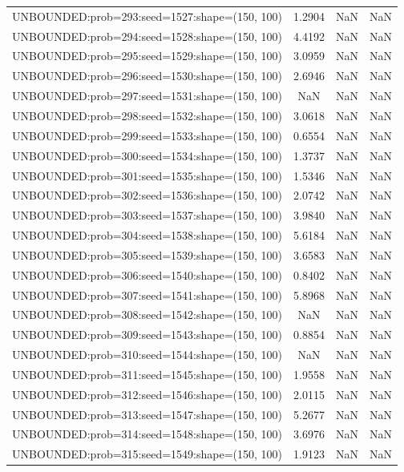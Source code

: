 \begin{longtable}{lccc}
UNBOUNDED:prob=293:seed=1527:shape=(150, 100) &  1.2904 &   NaN &    NaN \\
UNBOUNDED:prob=294:seed=1528:shape=(150, 100) &  4.4192 &   NaN &    NaN \\
UNBOUNDED:prob=295:seed=1529:shape=(150, 100) &  3.0959 &   NaN &    NaN \\
UNBOUNDED:prob=296:seed=1530:shape=(150, 100) &  2.6946 &   NaN &    NaN \\
UNBOUNDED:prob=297:seed=1531:shape=(150, 100) &     NaN &   NaN &    NaN \\
UNBOUNDED:prob=298:seed=1532:shape=(150, 100) &  3.0618 &   NaN &    NaN \\
UNBOUNDED:prob=299:seed=1533:shape=(150, 100) &  0.6554 &   NaN &    NaN \\
UNBOUNDED:prob=300:seed=1534:shape=(150, 100) &  1.3737 &   NaN &    NaN \\
UNBOUNDED:prob=301:seed=1535:shape=(150, 100) &  1.5346 &   NaN &    NaN \\
UNBOUNDED:prob=302:seed=1536:shape=(150, 100) &  2.0742 &   NaN &    NaN \\
UNBOUNDED:prob=303:seed=1537:shape=(150, 100) &  3.9840 &   NaN &    NaN \\
UNBOUNDED:prob=304:seed=1538:shape=(150, 100) &  5.6184 &   NaN &    NaN \\
UNBOUNDED:prob=305:seed=1539:shape=(150, 100) &  3.6583 &   NaN &    NaN \\
UNBOUNDED:prob=306:seed=1540:shape=(150, 100) &  0.8402 &   NaN &    NaN \\
UNBOUNDED:prob=307:seed=1541:shape=(150, 100) &  5.8968 &   NaN &    NaN \\
UNBOUNDED:prob=308:seed=1542:shape=(150, 100) &     NaN &   NaN &    NaN \\
UNBOUNDED:prob=309:seed=1543:shape=(150, 100) &  0.8854 &   NaN &    NaN \\
UNBOUNDED:prob=310:seed=1544:shape=(150, 100) &     NaN &   NaN &    NaN \\
UNBOUNDED:prob=311:seed=1545:shape=(150, 100) &  1.9558 &   NaN &    NaN \\
UNBOUNDED:prob=312:seed=1546:shape=(150, 100) &  2.0115 &   NaN &    NaN \\
UNBOUNDED:prob=313:seed=1547:shape=(150, 100) &  5.2677 &   NaN &    NaN \\
UNBOUNDED:prob=314:seed=1548:shape=(150, 100) &  3.6976 &   NaN &    NaN \\
UNBOUNDED:prob=315:seed=1549:shape=(150, 100) &  1.9123 &   NaN &    NaN \\

\end{longtable}
